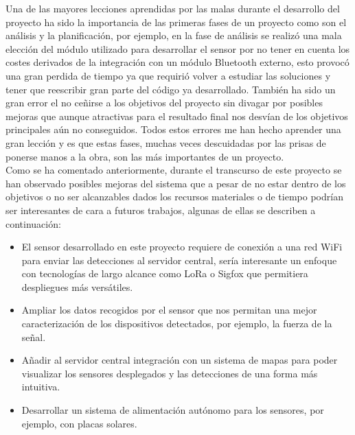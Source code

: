 \documentclass[../proyecto.tex]{subfiles}
\begin{document}
Una de las mayores lecciones aprendidas por las malas durante el desarrollo del proyecto ha sido la importancia de las primeras fases de un proyecto como son el análisis y la planificación, por ejemplo, en la fase de análisis se realizó una mala elección del módulo utilizado para desarrollar el sensor por no tener en cuenta los costes derivados de la integración con un módulo Bluetooth externo, esto provocó una gran perdida de tiempo ya que requirió volver a estudiar las soluciones y tener que reescribir gran parte del código ya desarrollado. También ha sido un gran error el no ceñirse a los objetivos del proyecto sin divagar por posibles mejoras que aunque atractivas para el resultado final nos desvían de los objetivos principales aún no conseguidos. Todos estos errores me han hecho aprender una gran lección y es que estas fases, muchas veces descuidadas por las prisas de ponerse manos a la obra, son las más importantes de un proyecto.\\

Como se ha comentado anteriormente, durante el transcurso de este proyecto se han observado posibles mejoras del sistema que a pesar de no estar dentro de los objetivos o no ser alcanzables dados los recursos materiales o de tiempo podrían ser interesantes de cara a futuros trabajos, algunas de ellas se describen a continuación:\\

\begin{itemize}
  \item El sensor desarrollado en este proyecto requiere de conexión a una red WiFi para enviar las detecciones al servidor central, sería interesante un enfoque con tecnologías de largo alcance como LoRa o Sigfox que permitiera despliegues más versátiles.
  \item Ampliar los datos recogidos por el sensor que nos permitan una mejor caracterización de los dispositivos detectados, por ejemplo, la fuerza de la señal.
  \item Añadir al servidor central integración con un sistema de mapas para poder visualizar los sensores desplegados y las detecciones de una forma más intuitiva.
  \item Desarrollar un sistema de alimentación autónomo para los sensores, por ejemplo, con placas solares.

\end{itemize}
\end{document}
